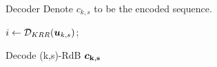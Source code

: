 \begin{frame}{Decoder}
    Denote $c_{k,s}$ to be the encoded sequence.
    \begin{algorithm}[H]
    \DontPrintSemicolon
        \BlankLine
        
        $i \gets \mathcal{D}_{KRR}({\boldsymbol u}_{k,s})$; \\
        \caption{Decode (k,s)-RdB $\bf{\boldsymbol c}_{k,s}$}
        \label{alg:decode}
    \end{algorithm}  
\end{frame}